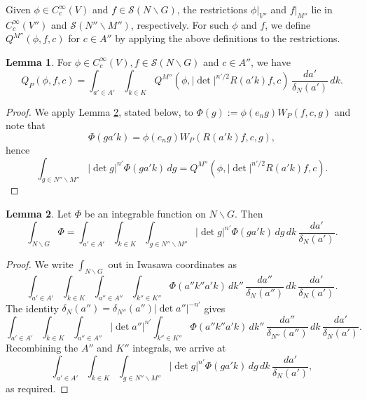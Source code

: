 \documentclass[reqno]{amsart}
\theoremstyle{plain} \newtheorem{theorem} {Theorem}
\theoremstyle{definition} \newtheorem{definition} [theorem] {Definition}
\theoremstyle{itplain} %
\newtheorem{lemma}[theorem]{Lemma}
\numberwithin{equation}{section}
\numberwithin{theorem}{section}
\begin{document}
Given $\phi \in C_c^\infty(V)$ and $f \in \mathcal{S}(N \backslash G)$, the restrictions $\phi|_{V''}$ and $f|_{M''}$ lie in $C_c^\infty(V'')$ and $\mathcal{S}(N'' \backslash M'')$, respectively.  For such $\phi$ and $f$, we define $Q^{M''}(\phi,f,c)$ for $c \in A''$ by applying the above definitions to the restrictions.

\begin{lemma}\label{lem:reduce-Q-P-to-Q}
  For $\phi \in C_c^\infty(V), f \in \mathcal{S}(N \backslash G)$ and $c \in A''$, we have
\begin{equation*}
  Q_P(\phi, f, c)
  = \int _{a ' \in A'}
  \int _{k \in K}
  Q^{M''}\left(\phi, |\det|^{n'/2 }R(a' k) f, c\right) \, \frac{d a '}{\delta_N(a')} \, d k.
\end{equation*}
\end{lemma}
\begin{proof}
  We apply Lemma \ref{lem:standard:rewrite-N-G-via-M}, stated below, to $\Phi(g) := \phi(e_n g) W_P(f,c,g)$ and note that
  \begin{equation*}
    \Phi(g a' k)
    =
    \phi(e_n g)
    W_P(R(a' k) f, c, g),
  \end{equation*}
  hence
  \begin{equation*}
    \int _{g \in N'' \backslash M''}
    |\det g|^{n'} 
    \Phi(g a ' k) \, d g
    =
    Q^{M''}\left(\phi, |\det|^{n'/2} R(a' k) f, c\right).
\end{equation*}
\end{proof}

\begin{lemma}\label{lem:standard:rewrite-N-G-via-M}
  Let $\Phi$ be an integrable function on $N \backslash G$.  Then
\begin{equation*}
  \int _{N \backslash G} \Phi
  =
        \int _{a ' \in A'}
    \int _{k \in K}
    \int _{g \in N'' \backslash M''}
    |\det g|^{n'}
    \Phi (g a' k)
    \, d g
     \, d k \, \frac{d a '}{\delta_N(a')}.
\end{equation*}
\end{lemma}
\begin{proof}
  We write $\int_{N \backslash G}$ out in Iwasawa coordinates as
  \begin{equation*}
    \int _{a' \in A'}
    \int _{k \in K}
    \int _{a'' \in A''}
    \int _{k'' \in K'' }
    \Phi (a'' k'' a' k)
    \, d k''
    \, \frac{d a''}{\delta_N(a'')}
    \, d k
    \, \frac{d a'}{\delta_N (a')}.
\end{equation*}
The identity $\delta_N(a'') = \delta_{N''}(a'') |\det a''|^{-n'}$ gives
\begin{equation*}
  \int _{a' \in A'}
  \int _{k \in K}
  \int _{a'' \in A''}
  |\det a''|^{n'}
  \int _{k'' \in K'' }
  \Phi( a'' k'' a' k)
  \, d k''
  \, \frac{d a''}{\delta_{N''}(a'')}
  \, d k
  \, \frac{d a'}{\delta_N (a')}.
\end{equation*}
Recombining the $A''$ and $K''$ integrals, we arrive at
\begin{equation*}
  \int _{a' \in A'}
  \int _{k \in K}
  \int _{g \in N'' \backslash M''}
  |\det g|^{n'}
  \Phi(g a' k)
  \, d g
  \, d k
  \, \frac{d a'}{\delta_N (a')},
\end{equation*}
as required.
\end{proof}
\end{document}
